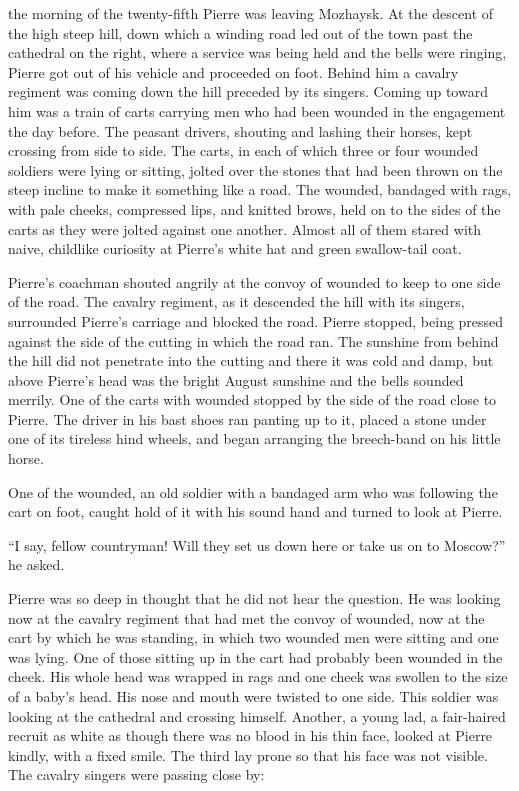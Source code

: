  the morning of the twenty-fifth Pierre was leaving
Mozhaysk. At the descent of the high steep hill, down which a
winding road led out of the town past the cathedral on the right,
where a service was being held and the bells were ringing, Pierre
got out of his vehicle and proceeded on foot. Behind him a
cavalry regiment was coming down the hill preceded by its
singers. Coming up toward him was a train of carts carrying men
who had been wounded in the engagement the day before. The
peasant drivers, shouting and lashing their horses, kept crossing
from side to side. The carts, in each of which three or four
wounded soldiers were lying or sitting, jolted over the stones
that had been thrown on the steep incline to make it something
like a road. The wounded, bandaged with rags, with pale cheeks,
compressed lips, and knitted brows, held on to the sides of the
carts as they were jolted against one another. Almost all of them
stared with naive, childlike curiosity at Pierre's white hat and
green swallow-tail coat.

Pierre's coachman shouted angrily at the convoy of wounded to
keep to one side of the road. The cavalry regiment, as it
descended the hill with its singers, surrounded Pierre's carriage
and blocked the road.  Pierre stopped, being pressed against the
side of the cutting in which the road ran. The sunshine from
behind the hill did not penetrate into the cutting and there it
was cold and damp, but above Pierre's head was the bright August
sunshine and the bells sounded merrily. One of the carts with
wounded stopped by the side of the road close to Pierre. The
driver in his bast shoes ran panting up to it, placed a stone
under one of its tireless hind wheels, and began arranging the
breech-band on his little horse.

One of the wounded, an old soldier with a bandaged arm who was
following the cart on foot, caught hold of it with his sound hand
and turned to look at Pierre.

``I say, fellow countryman! Will they set us down here or take us
on to Moscow?'' he asked.

Pierre was so deep in thought that he did not hear the
question. He was looking now at the cavalry regiment that had met
the convoy of wounded, now at the cart by which he was standing,
in which two wounded men were sitting and one was lying. One of
those sitting up in the cart had probably been wounded in the
cheek. His whole head was wrapped in rags and one cheek was
swollen to the size of a baby's head. His nose and mouth were
twisted to one side. This soldier was looking at the cathedral
and crossing himself. Another, a young lad, a fair-haired recruit
as white as though there was no blood in his thin face, looked at
Pierre kindly, with a fixed smile. The third lay prone so that
his face was not visible. The cavalry singers were passing close
by:

